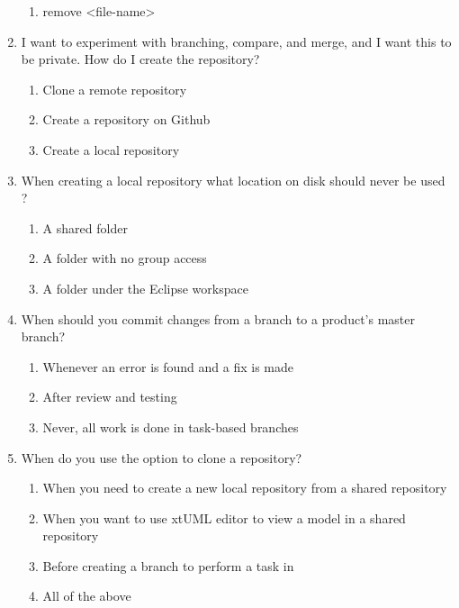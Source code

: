 \documentclass[11pt,a4paper]{article}
\begin{document}
\begin{enumerate}
\begin{enumerate}
    \item remove \textless file-name\textgreater
    \end{enumerate}
    \item I want to experiment with branching, compare, and merge, and I want this to be private. How do I create the repository?
    \begin{enumerate}
    \item Clone a remote repository
    \item Create a repository on Github
    \item Create a local repository
    \end{enumerate}
    \item  When creating a local repository what location on disk should never be used ?
    \begin{enumerate}
    \item A shared folder
    \item A folder with no group access
    \item A folder under the Eclipse workspace
    \end{enumerate}
    \item  When should you commit changes from a branch to a product's master branch?
    \begin{enumerate}
    \item Whenever an error is found and a fix is made
    \item After review and testing
    \item Never, all work is done in task-based branches
    \end{enumerate}
    \item  When do you use the option to clone a repository?
    \begin{enumerate}
    \item When you need to create a new local repository from a shared repository
    \item When you want to use xtUML editor to view a model in a shared repository
    \item Before creating a branch to perform a task in
    \item All of the above
    \end{enumerate}
    
    
\end{enumerate}
\end{document}
